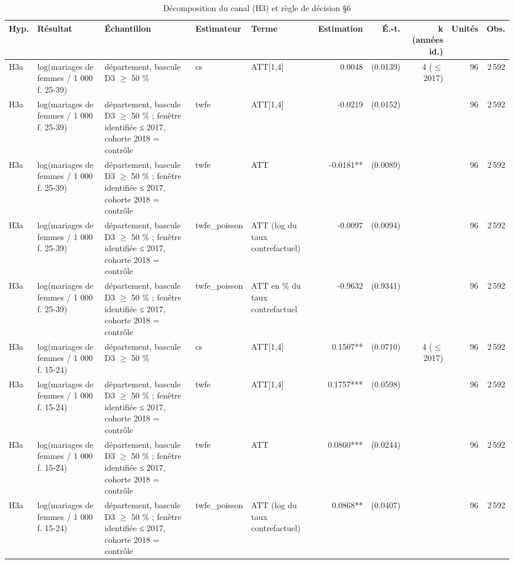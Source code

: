 \begin{table}\centering
\begin{threeparttable}
\caption{Décomposition du canal (H3) et règle de décision §6}\label{tab:h3}
\scriptsize
\begin{tabular}{lp{3.8cm}p{5.5cm}lp{3.5cm}rrrrr}
\toprule
Hyp. & Résultat & Échantillon & Estimateur & Terme & Estimation & É.-t. & k (années id.) & Unités & Obs. \\
\midrule
H3a & log(mariages de femmes / 1 000 f. 25-39) & département, bascule D3 $\geq$ 50 \% & cs & ATT[1,4] & 0.0048 & (0.0139) & 4 ($\leq$ 2017) & 96 & 2\,592 \\
H3a & log(mariages de femmes / 1 000 f. 25-39) & département, bascule D3 $\geq$ 50 \% ; fenêtre identifiée ≤ 2017, cohorte 2018 = contrôle & twfe & ATT[1,4] & -0.0219 & (0.0152) &  & 96 & 2\,592 \\
H3a & log(mariages de femmes / 1 000 f. 25-39) & département, bascule D3 $\geq$ 50 \% ; fenêtre identifiée ≤ 2017, cohorte 2018 = contrôle & twfe & ATT & -0.0181** & (0.0089) &  & 96 & 2\,592 \\
H3a & log(mariages de femmes / 1 000 f. 25-39) & département, bascule D3 $\geq$ 50 \% ; fenêtre identifiée ≤ 2017, cohorte 2018 = contrôle & twfe\_poisson & ATT (log du taux contrefactuel) & -0.0097 & (0.0094) &  & 96 & 2\,592 \\
H3a & log(mariages de femmes / 1 000 f. 25-39) & département, bascule D3 $\geq$ 50 \% ; fenêtre identifiée ≤ 2017, cohorte 2018 = contrôle & twfe\_poisson & ATT en \% du taux contrefactuel & -0.9632 & (0.9341) &  & 96 & 2\,592 \\
H3a & log(mariages de femmes / 1 000 f. 15-24) & département, bascule D3 $\geq$ 50 \% & cs & ATT[1,4] & 0.1507** & (0.0710) & 4 ($\leq$ 2017) & 96 & 2\,592 \\
H3a & log(mariages de femmes / 1 000 f. 15-24) & département, bascule D3 $\geq$ 50 \% ; fenêtre identifiée ≤ 2017, cohorte 2018 = contrôle & twfe & ATT[1,4] & 0.1757*** & (0.0598) &  & 96 & 2\,592 \\
H3a & log(mariages de femmes / 1 000 f. 15-24) & département, bascule D3 $\geq$ 50 \% ; fenêtre identifiée ≤ 2017, cohorte 2018 = contrôle & twfe & ATT & 0.0860*** & (0.0244) &  & 96 & 2\,592 \\
H3a & log(mariages de femmes / 1 000 f. 15-24) & département, bascule D3 $\geq$ 50 \% ; fenêtre identifiée ≤ 2017, cohorte 2018 = contrôle & twfe\_poisson & ATT (log du taux contrefactuel) & 0.0868** & (0.0407) &  & 96 & 2\,592 \\

\end{tabular}
\end{threeparttable}
\end{table}
